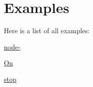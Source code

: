 \section{Examples}
Here is a list of all examples\-:\begin{DoxyCompactItemize}
\item 
\hyperlink{node--example}{node-\/}
\item 
\hyperlink{_on-example}{On}
\item 
\hyperlink{stop-example}{stop}
\end{DoxyCompactItemize}
